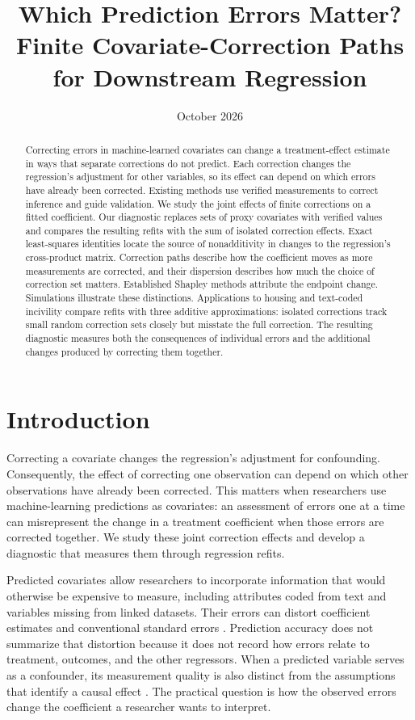 \documentclass[11pt]{article}
\title{\textbf{Which Prediction Errors Matter?}\\[0.4em]
\large Finite Covariate-Correction Paths for Downstream Regression}
\author{}
\date{October 2026}
\begin{document}
\maketitle
\begin{abstract}
Correcting errors in machine-learned covariates can change a treatment-effect
estimate in ways that separate corrections do not predict. Each correction
changes the regression's adjustment for other variables, so its effect can
depend on which errors have already been corrected. Existing methods use
verified measurements to correct inference and guide validation. We study the
joint effects of finite corrections on a fitted coefficient. Our diagnostic
replaces sets of proxy covariates with verified values and compares the resulting
refits with the sum of isolated correction effects. Exact least-squares identities
locate the source of nonadditivity in changes to the regression's cross-product
matrix. Correction paths describe how the coefficient moves as more measurements
are corrected, and their dispersion describes how much the choice of correction
set matters. Established Shapley methods attribute the endpoint change.
Simulations illustrate these distinctions. Applications to housing and text-coded
incivility compare refits with three additive approximations: isolated corrections
track small random correction sets closely but misstate the full correction.
The resulting diagnostic measures both the consequences
of individual errors and the additional changes produced by correcting them
together.
\end{abstract}

\section{Introduction}

Correcting a covariate changes the regression's adjustment for confounding.
Consequently, the effect of correcting one observation can depend on which other
observations have already been corrected. This matters when researchers use
machine-learning predictions as covariates: an assessment of errors one at a time
can misrepresent the change in a treatment coefficient when those errors are
corrected together. We study these joint correction effects and develop a
diagnostic that measures them through regression refits.

Predicted covariates allow researchers to incorporate information that would
otherwise be expensive to measure, including attributes coded from text and
variables missing from linked datasets. Their errors can distort coefficient
estimates and conventional standard errors \citep{fong2021,battaglia2024}.
Prediction accuracy does not summarize that distortion because it does not
record how errors relate to treatment, outcomes, and the other regressors.
When a predicted variable serves as a confounder, its measurement quality is
also distinct from the assumptions that identify a causal effect
\citep{egami2022}. The practical question is how the observed errors change the
coefficient a researcher wants to interpret.
\end{document}

